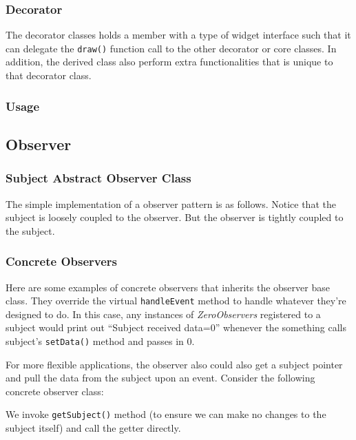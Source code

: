 \subsubsection{Decorator}
The decorator classes holds a member with a type of widget interface such that it can delegate the \texttt{draw()} function call to the other decorator or core classes. In addition, the derived class also perform extra functionalities that is unique to that decorator class.

\subsubsection{Usage}


\subsection{Observer}\label{code:observer}
\subsubsection{Subject Abstract Observer Class}
The simple implementation of a observer pattern is as follows. Notice that the subject is loosely coupled to the observer. But the observer is tightly coupled to the subject.

\subsubsection{Concrete Observers}
Here are some examples of concrete observers that inherits the observer base class. They override the virtual \texttt{handleEvent} method to handle whatever they're designed to do. In this case, any instances of \textit{ZeroObservers} registered to a subject would print out ``Subject received data=0'' whenever the something calls subject's \texttt{setData()} method and passes in 0.

For more flexible applications, the observer also could also get a subject pointer and pull the data from the subject upon an event. Consider the following concrete observer class:

We invoke \texttt{getSubject()} method (to ensure we can make no changes to the subject itself) and call the getter directly.



